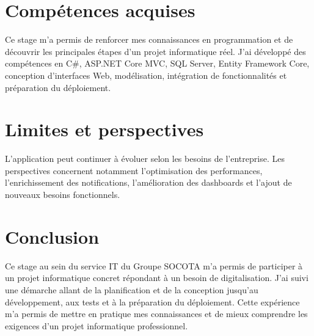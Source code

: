 \documentclass[12pt,a4paper,oneside]{report}
\begin{document}
\chapter{Compétences acquises}
Ce stage m'a permis de renforcer mes connaissances en programmation et de découvrir les principales étapes d'un projet informatique réel. J'ai développé des compétences en C\#, ASP.NET Core MVC, SQL Server, Entity Framework Core, conception d'interfaces Web, modélisation, intégration de fonctionnalités et préparation du déploiement.

\chapter{Limites et perspectives}
L'application peut continuer à évoluer selon les besoins de l'entreprise. Les perspectives concernent notamment l'optimisation des performances, l'enrichissement des notifications, l'amélioration des dashboards et l'ajout de nouveaux besoins fonctionnels.

\chapter{Conclusion}
Ce stage au sein du service IT du Groupe SOCOTA m'a permis de participer à un projet informatique concret répondant à un besoin de digitalisation. J'ai suivi une démarche allant de la planification et de la conception jusqu'au développement, aux tests et à la préparation du déploiement. Cette expérience m'a permis de mettre en pratique mes connaissances et de mieux comprendre les exigences d'un projet informatique professionnel.
\end{document}
